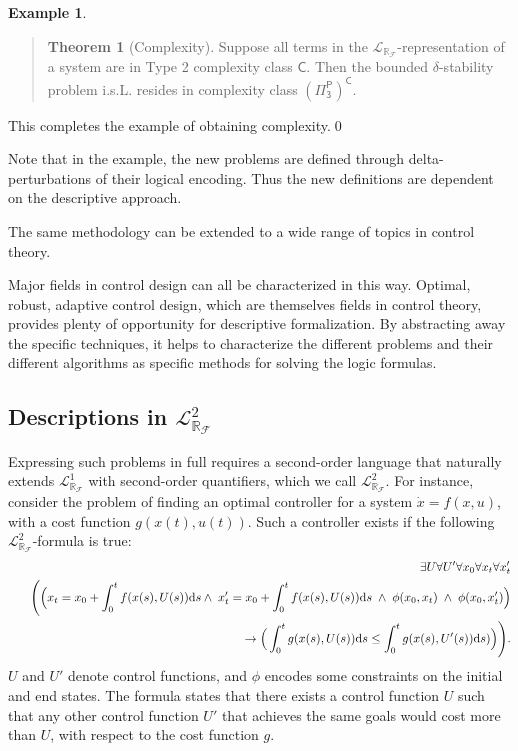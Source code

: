 \documentclass[10pt]{article}
\newcommand{\lrf}{\mathcal{L}_{\mathbb{R}_{\mathcal{F}}}}
\theoremstyle{definition}
\newtheorem{example}{Example}[section]
\newtheorem{theorem}{Theorem}[section]
\begin{document}
\begin{example}
\begin{quote}
\vspace{-.5cm}
\begin{theorem}[Complexity]
Suppose all terms in the $\lrf$-representation of a system are in Type 2 complexity class $\mathsf{C}$.  Then the bounded $\delta$-stability problem i.s.L. resides in complexity class $\mathsf{(\Pi^P_3)^C}$. 
\end{theorem}
\end{quote}
This completes the example of obtaining complexity.\qed
\end{example}
Note that in the example, the new problems are defined through delta-perturbations of their logical encoding. Thus the new definitions are dependent on the descriptive approach. 

The same methodology can be extended to a wide range of topics in control theory. 

Major fields in control design can all be characterized in this way. Optimal, robust, adaptive control design, which are themselves fields in control theory, provides plenty of opportunity for descriptive formalization. By abstracting away the specific techniques, it helps to characterize the different problems and their different algorithms as specific methods for solving the logic formulas. 

\subsection{Descriptions in $\lrf^2$} 

Expressing such problems in full requires a second-order language that naturally extends $\lrf^1$ with second-order quantifiers, which we call $\lrf^2$. For instance, consider the problem of finding an optimal controller for a system $\dot x = f({x}, u)$, with a cost function $g(x(t),u(t))$. Such a controller exists if the following $\lrf^2$-formula is true:
\begin{eqnarray*}
& &\exists U \forall U' \forall {x_0}\forall {x_t} \forall {x_t'}\\
& &\Bigg( \Big({x_t} = {x_0} + \int_{0}^t f({x}(s),U(s))\mathrm{d}s \wedge\;  x_t' = x_0 + \int_{0}^t f(x(s),U(s))\mathrm{d}s
\;\wedge\; \phi(x_0, x_t) \;\wedge\; \phi(x_0, x_t')\Big)\\
& &\hspace{6.5cm}\rightarrow \Big(\int_0^t g(x(s),U(s))\mathrm{d}s \leq  \int_0^t g(x(s),U'(s))\mathrm{d}s)\Big) \Bigg).
\end{eqnarray*}
$U$ and $U'$ denote control functions, and $\phi$ encodes some constraints on the initial and end states. The formula states that there exists a control function $U$ such that any other control function $U'$ that achieves the same goals would cost more than $U$, with respect to the cost function $g$. 
\end{document}

